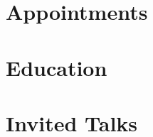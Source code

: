 \documentclass[11pt,a4paper]{article}
\begin{document}
\makeheader
\bigskip
\bigskip

\section*{Appointments}%


\section*{Education}%

 
\begin{publications}
%
%
%
%
%
%
%  
%
%
%
%
\end{publications}

\section*{Invited Talks}%

\end{document}
